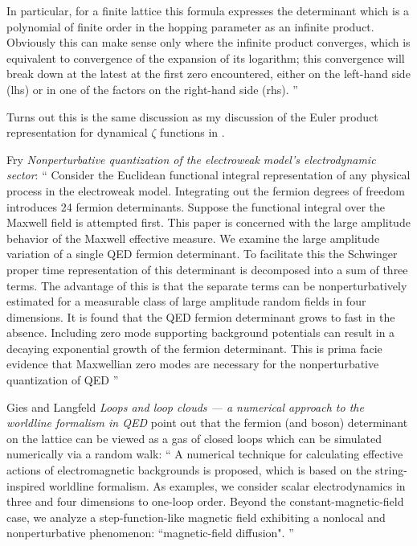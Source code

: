 \begin{description}
In particular, for a finite lattice this formula expresses the determinant
which is a polynomial of finite order in the hopping parameter as an infinite
product. Obviously this can make sense only where the infinite product
converges, which is equivalent to convergence of the expansion of its
logarithm; this convergence will break down at the latest at the first zero
encountered, either on the left-hand side (lhs) or in one of the factors on
the right-hand side (rhs).
''

Turns out this is the same discussion as my discussion of the Euler product
representation for dynamical $\zeta$ functions in \wwwcb{}.

Fry {\em Nonperturbative quantization of the electroweak model's
electrodynamic sector}: `` Consider the Euclidean functional integral
representation of any physical process in the electroweak model. Integrating
out the fermion degrees of freedom introduces 24 fermion determinants.
Suppose the functional integral over the Maxwell field is attempted first.
This paper is concerned with the large amplitude behavior of the Maxwell
effective measure. We examine the large amplitude variation of a single QED
fermion determinant. To facilitate this the Schwinger proper time
representation of this determinant is decomposed into a sum of three terms.
The advantage of this is that the separate terms can be nonperturbatively
estimated for a measurable class of large amplitude random fields in four
dimensions. It is found that the QED fermion determinant grows to fast in the
absence. Including zero mode supporting background potentials can result in a
decaying exponential growth of the fermion determinant. This is prima facie
evidence that Maxwellian zero modes are necessary for the nonperturbative
quantization of QED
''

Gies and Langfeld {\em Loops and loop clouds — a numerical
approach to the worldline formalism in {QED}}
point out that the fermion (and boson) determinant on the lattice can be
viewed as a gas of closed loops which can be simulated numerically via a
random walk: ``
A numerical technique for calculating effective actions of electromagnetic
backgrounds is proposed, which is based on the string-inspired worldline
formalism. As examples, we consider scalar electrodynamics in three and four
dimensions to one-loop order. Beyond the constant-magnetic-field case, we
analyze a step-function-like magnetic field exhibiting a nonlocal and
nonperturbative phenomenon: ``magnetic-field diffusion".
''



\end{description}
